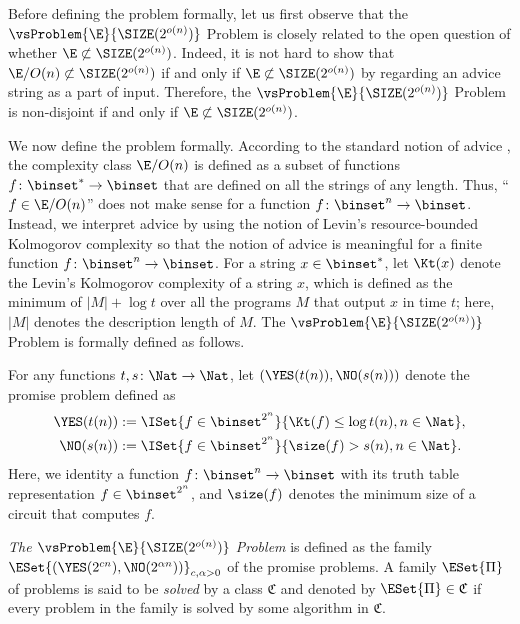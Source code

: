 \documentclass{toc}
\begin{document}
Before defining the problem formally,
let us first observe that the $\vsProblem{\E}{\SIZE(2^{o(n)})}$ Problem is
closely related to
the open question of whether $\E \not\subset \SIZE(2^{o(n)})$.
Indeed,
it is not hard to show that
$\E/O(n) \not\subset {\SIZE(2^{o(n)})}$
if and only if
$\E \not\subset {\SIZE(2^{o(n)})}$
by regarding an advice string as a part of input.
Therefore, the $\vsProblem{\E}{\SIZE(2^{o(n)})}$ Problem
is non-disjoint
if and only if
$\E \not\subset \SIZE(2^{o(n)})$.

We now define the problem formally.
According to the standard notion of advice \cite{KarpL82_advice},
the complexity class $\E/O(n)$ is defined as a subset of functions $f \colon \binset^* \to \binset$ that are defined on all the strings of any length.
Thus, ``$f \in \E/O(n)$'' does not make sense for a function $f \colon \binset^n \to \binset$.
Instead, we interpret advice
by using
the notion of Levin's resource-bounded Kolmogorov complexity \cite{Levin84_iandc_journals}
so that the notion of advice is meaningful for a finite function $f \colon \binset^n \to \binset$.
For a string $x \in \binset^*$,
let $\Kt(x)$ denote
the Levin's Kolmogorov complexity of a string $x$,
which is defined as the minimum of $|M| + \log t$ over all the programs $M$
that output $x$ in time $t$; here, $|M|$ denotes the description length of $M$.
The $\vsProblem{\E}{\SIZE(2^{o(n)})}$ Problem is formally defined as follows.
\begin{definition}
  \label{def_EvsSIZE}
  For any functions $t, s \colon \Nat \to \Nat$,
  let
  $(\YES(t(n)), \NO(s(n)))$
  denote the promise problem defined as
  \begin{align*}
    \YES(t(n)) & := \ISet{ f \in \binset^{2^n} }{ \Kt(f) \le \log t(n), n \in \Nat },
    \\
    \NO(s(n))  & := \ISet{ f \in \binset^{2^n} }{ \size(f) > s(n), n \in \Nat }.
  \end{align*}
  Here, we identity
  a function $f \colon \binset^n \to \binset$
  with its truth table representation $f \in \binset^{2^n}$,
  and $\size(f)$ denotes the minimum size of a circuit that computes $f$.

  \emph{The $\vsProblem{\E}{\SIZE(2^{o(n)})}$ Problem} is defined as the family
  $\ESet{ (\YES(2^{c n}), \NO(2^{\alpha n})) }_{c, \alpha > 0}$
  of the promise problems.
  A family $\ESet{\Pi}$ of problems is said to be \emph{solved} by a class $\mathfrak{C}$
  and denoted by $\ESet{\Pi} \in \mathfrak{C}$
  if every problem in the family is solved by some algorithm in $\mathfrak{C}$.
\end{definition}
\end{document}
